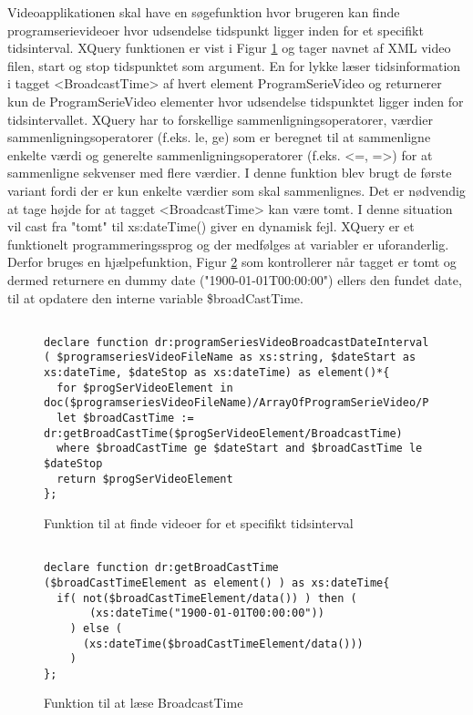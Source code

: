 Videoapplikationen skal have en søgefunktion hvor brugeren kan finde programserievideoer hvor udsendelse tidspunkt ligger inden for et specifikt tidsinterval. XQuery funktionen er vist i Figur \ref{xquerySearch:programSeriesVideoBroadcastDateInterval} og tager navnet af XML video filen, start og stop tidspunktet som argument. En for lykke læser tidsinformation i tagget <BroadcastTime> af hvert element ProgramSerieVideo og returnerer kun de ProgramSerieVideo elementer hvor udsendelse tidspunktet ligger inden for tidsintervallet. XQuery har to forskellige sammenligningsoperatorer, værdier sammenligningsoperatorer (f.eks. le, ge) som er beregnet til at sammenligne enkelte værdi og generelte sammenligningsoperatorer (f.eks. <=, =>) for at sammenligne sekvenser med flere værdier. I denne funktion blev brugt de første variant fordi der er kun enkelte værdier som skal sammenlignes. Det er nødvendig at tage højde for at tagget <BroadcastTime> kan være tomt. I denne situation vil cast fra "tomt" til xs:dateTime() giver en dynamisk fejl. XQuery er et funktionelt programmeringssprog og der medfølges at variabler er uforanderlig. Derfor bruges en hjælpefunktion, Figur \ref{xquerySearch:getBroadCastTime} som kontrollerer når tagget er tomt og dermed returnere en dummy date ("1900-01-01T00:00:00") ellers den fundet date, til at opdatere den interne variable \$broadCastTime.


\begin{figure}[ht]
\begin{lstlisting}[style=FAKE_XQUERY, language=XQUERY]

declare function dr:programSeriesVideoBroadcastDateInterval
( $programseriesVideoFileName as xs:string, $dateStart as xs:dateTime, $dateStop as xs:dateTime) as element()*{
  for $progSerVideoElement in doc($programseriesVideoFileName)/ArrayOfProgramSerieVideo/ProgramSerieVideo
  let $broadCastTime := dr:getBroadCastTime($progSerVideoElement/BroadcastTime)
  where $broadCastTime ge $dateStart and $broadCastTime le $dateStop
  return $progSerVideoElement
}; 

\end{lstlisting}
\caption{Funktion til at finde videoer for et specifikt tidsinterval}
\label{xquerySearch:programSeriesVideoBroadcastDateInterval}
\end{figure}



\begin{figure}[ht]
\begin{lstlisting}[style=FAKE_XQUERY, language=XQUERY]

declare function dr:getBroadCastTime
($broadCastTimeElement as element() ) as xs:dateTime{
  if( not($broadCastTimeElement/data()) ) then (
       (xs:dateTime("1900-01-01T00:00:00"))
    ) else (
      (xs:dateTime($broadCastTimeElement/data()))
    ) 
};

\end{lstlisting}
\caption{Funktion til at læse BroadcastTime}
\label{xquerySearch:getBroadCastTime}
\end{figure}



